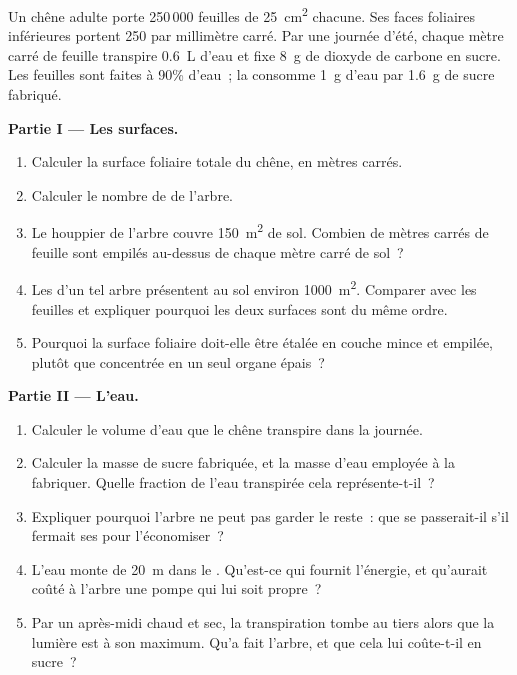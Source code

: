 \begin{problem}
\label{pb:g12:plant-rooted-life:1}
Un chêne adulte porte 250\,000 feuilles de \qty{25}{cm^2} chacune. Ses
faces foliaires inférieures portent 250  par millimètre carré.
Par une journée d'été, chaque mètre carré de feuille transpire
\qty{0.6}{L} d'eau et fixe \qty{8}{g} de dioxyde de carbone en sucre.
Les feuilles sont faites à 90\% d'eau~; la  consomme
\qty{1}{g} d'eau par \qty{1.6}{g} de sucre fabriqué.

\medskip
\noindent\textbf{Partie I --- Les surfaces.}
\begin{enumerate}
  \item Calculer la surface foliaire totale du chêne, en mètres
        carrés.
  \item Calculer le nombre de  de l'arbre.
  \item Le houppier de l'arbre couvre \qty{150}{m^2} de sol. Combien
        de mètres carrés de feuille sont empilés au-dessus de chaque
        mètre carré de sol~?
  \item Les  d'un tel arbre présentent au sol environ
        \qty{1000}{m^2}. Comparer avec les feuilles et expliquer
        pourquoi les deux surfaces sont du même ordre.
  \item Pourquoi la surface foliaire doit-elle être étalée en couche
        mince et empilée, plutôt que concentrée en un seul organe
        épais~?
\end{enumerate}

\medskip
\noindent\textbf{Partie II --- L'eau.}
\begin{enumerate}[resume]
  \item Calculer le volume d'eau que le chêne transpire dans la
        journée.
  \item Calculer la masse de sucre fabriquée, et la masse d'eau
        employée à la fabriquer. Quelle fraction de l'eau transpirée
        cela représente-t-il~?
  \item Expliquer pourquoi l'arbre ne peut pas garder le reste~: que
        se passerait-il s'il fermait ses  pour l'économiser~?
  \item L'eau monte de \qty{20}{m} dans le . Qu'est-ce qui
        fournit l'énergie, et qu'aurait coûté à l'arbre une pompe qui
        lui soit propre~?
  \item Par un après-midi chaud et sec, la transpiration tombe au
        tiers alors que la lumière est à son maximum. Qu'a fait
        l'arbre, et que cela lui coûte-t-il en sucre~?
\end{enumerate}


\end{problem}
